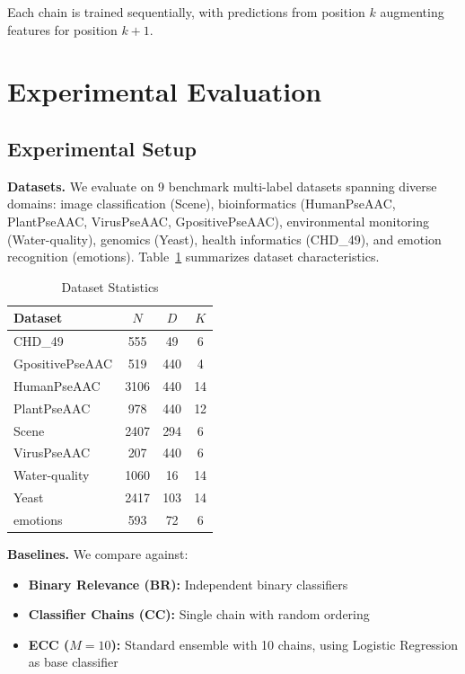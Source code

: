 \documentclass[conference]{IEEEtran}
\begin{document}
Each chain is trained sequentially, with predictions from position $k$ augmenting features for position $k+1$.

\section{Experimental Evaluation}

\subsection{Experimental Setup}

\textbf{Datasets.} We evaluate on 9 benchmark multi-label datasets spanning diverse domains: image classification (Scene), bioinformatics (HumanPseAAC, PlantPseAAC, VirusPseAAC, GpositivePseAAC), environmental monitoring (Water-quality), genomics (Yeast), health informatics (CHD\_49), and emotion recognition (emotions). Table~\ref{tab:dataset_stats} summarizes dataset characteristics.

\begin{table}[t]
\centering
\caption{Dataset Statistics}
\label{tab:dataset_stats}
\small
\begin{tabular}{lccc}
\toprule
\textbf{Dataset} & \textbf{$N$} & \textbf{$D$} & \textbf{$K$} \\
\midrule
CHD\_49 & 555 & 49 & 6 \\
GpositivePseAAC & 519 & 440 & 4 \\
HumanPseAAC & 3106 & 440 & 14 \\
PlantPseAAC & 978 & 440 & 12 \\
Scene & 2407 & 294 & 6 \\
VirusPseAAC & 207 & 440 & 6 \\
Water-quality & 1060 & 16 & 14 \\
Yeast & 2417 & 103 & 14 \\
emotions & 593 & 72 & 6 \\
\bottomrule
\end{tabular}
\end{table}

\textbf{Baselines.} We compare against:
\begin{itemize}
    \item \textbf{Binary Relevance (BR):} Independent binary classifiers
    \item \textbf{Classifier Chains (CC):} Single chain with random ordering
    \item \textbf{ECC ($M=10$):} Standard ensemble with 10 chains, using Logistic Regression as base classifier
\end{itemize}
\end{document}
